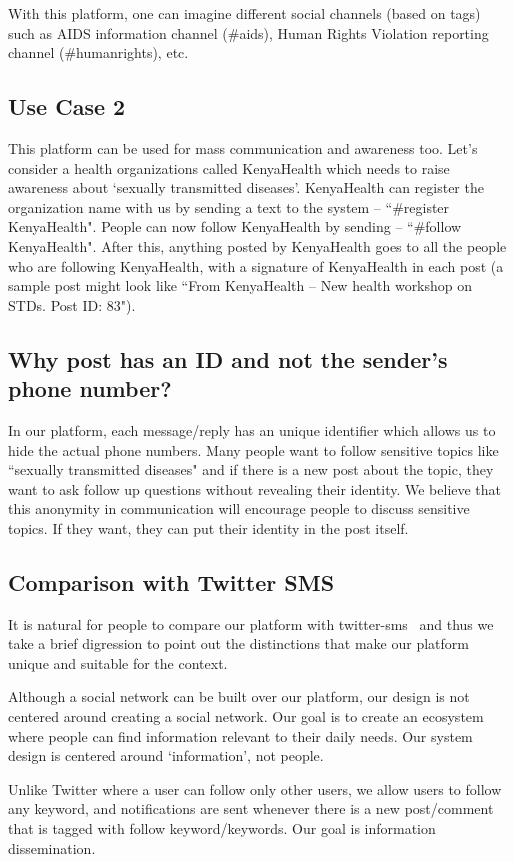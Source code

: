 \documentclass{chi-ext}
\begin{document}
With this platform, one can imagine different social channels (based on tags) such as AIDS information channel (\#aids), Human Rights Violation reporting channel (\#humanrights), etc.

\subsection{Use Case 2}
This platform can be used for mass communication and awareness too. Let's consider a health organizations called KenyaHealth which needs to raise awareness about `sexually transmitted diseases'. KenyaHealth can register the organization name with us by sending a text to the system -- ``\#register KenyaHealth". People can now follow KenyaHealth by sending -- ``\#follow KenyaHealth". After this, anything posted by KenyaHealth goes to all the people who are following KenyaHealth, with a signature of KenyaHealth in each post (a sample post might look like ``From KenyaHealth -- New health workshop on STDs. Post ID: 83").

\subsection{Why post has an ID and not the sender's phone number?}
In our platform, each message/reply has an unique identifier which allows us to hide the actual phone numbers. Many people want to follow sensitive topics like ``sexually transmitted diseases" and if there is a new post about the topic, they want to ask follow up questions without revealing their identity. We believe that this anonymity in communication will encourage people to discuss sensitive topics. If they want, they can put their identity in the post itself.

 
\subsection{Comparison with Twitter SMS}
It is natural for people to compare our platform with twitter-sms~\cite{TwitterSMS} and thus we take a brief digression to point out the distinctions that make our platform unique and suitable for the context. 

Although a social network can be built over our platform, our design is not centered around creating a social network. Our goal is to create an ecosystem where people can find information relevant to their daily needs. Our system design is centered around `information', not people.

Unlike Twitter where a user can follow only other users, we allow users to follow any keyword, and notifications are sent whenever there is a new post/comment that is tagged with  follow keyword/keywords. Our goal is information dissemination.
\end{document}
